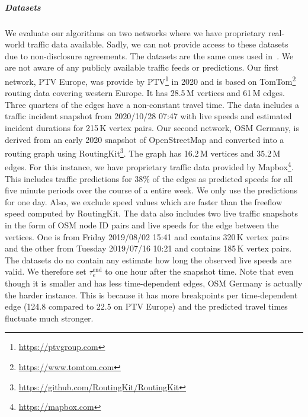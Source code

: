 \documentclass[a4paper,UKenglish,cleveref, autoref, thm-restate,anonymous]{lipics-v2021}
\begin{document}
\subparagraph{Datasets}
We evaluate our algorithms on two networks where we have proprietary real-world traffic data available.
Sadly, we can not provide access to these datasets due to non-disclosure agreements.
The datasets are the same ones used in~\cite{swz-sfert-21,strasser_et_al:LIPIcs.SEA.2021.6}.
We are not aware of any publicly available traffic feeds or predictions.
%
Our first network, PTV Europe, was provide by PTV\footnote{\url{https://ptvgroup.com}} in 2020 and is based on TomTom\footnote{\url{https://www.tomtom.com}} routing data covering western Europe.
It has 28.5\,M vertices and 61\,M edges.
Three quarters of the edges have a non-constant travel time.
The data includes a traffic incident snapshot from 2020/10/28 07:47 with live speeds and estimated incident durations for 215\,K vertex pairs.
%
Our second network, OSM Germany, is derived from an early 2020 snapshot of OpenStreetMap and converted into a routing graph using RoutingKit\footnote{\url{https://github.com/RoutingKit/RoutingKit}}.
The graph has 16.2\,M vertices and 35.2\,M edges.
For this instance, we have proprietary traffic data provided by Mapbox\footnote{\url{https://mapbox.com}}.
This includes traffic predictions for 38\% of the edges as predicted speeds for all five minute periods over the course of a entire week.
We only use the predictions for one day.
Also, we exclude speed values which are faster than the freeflow speed computed by RoutingKit.
The data also includes two live traffic snapshots in the form of OSM node ID pairs and live speeds for the edge between the vertices.
One is from Friday 2019/08/02 15:41 and contains 320\,K vertex pairs and the other from Tuesday 2019/07/16 10:21 and contains 185\,K vertex pairs.
The datasets do no contain any estimate how long the observed live speeds are valid.
We therefore set $\tau_e^{\operatorname{end}}$ to one hour after the snapshot time.
Note that even though it is smaller and has less time-dependent edges, OSM Germany is actually the harder instance.
This is because it has more breakpoints per time-dependent edge (124.8 compared to 22.5 on PTV Europe) and the predicted travel times fluctuate much stronger.
\end{document}
